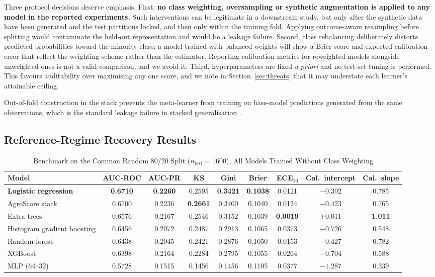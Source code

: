 \documentclass[journal]{IEEEtran}
\begin{document}
Three protocol decisions deserve emphasis. First, \textbf{no class weighting, oversampling or synthetic augmentation is applied to any model in the reported experiments.} Such interventions can be legitimate in a downstream study, but only after the synthetic data have been generated and the test partitions locked, and then only within the training fold. Applying outcome-aware resampling before splitting would contaminate the held-out representation and would be a leakage failure. Second, class rebalancing deliberately distorts predicted probabilities toward the minority class; a model trained with balanced weights will show a Brier score and expected calibration error that reflect the weighting scheme rather than the estimator. Reporting calibration metrics for reweighted models alongside unweighted ones is not a valid comparison, and we avoid it. Third, hyperparameters are fixed \textit{a priori} and no test-set tuning is performed. This favours auditability over maximising any one score, and we note in Section~\ref{sec:threats} that it may understate each learner's attainable ceiling.

Out-of-fold construction in the stack prevents the meta-learner from training on base-model predictions generated from the same observations, which is the standard leakage failure in stacked generalisation \cite{wolpert1992stacking}.

\subsection{Reference-Regime Recovery Results}

\begin{table}[!t]
\caption{Benchmark on the Common Random 80/20 Split ($n_{\text{test}}=1600$), All Models Trained Without Class Weighting}
\label{tab:benchmark}
\centering
\footnotesize
\begin{tabular}{@{}lcccccccc@{}}
\toprule
Model & AUC-ROC & AUC-PR & KS & Gini & Brier & ECE$_{10}$ & Cal.\ intercept & Cal.\ slope \\
\midrule
\textbf{Logistic regression}   & \textbf{0.6710} & \textbf{0.2260} & 0.2595 & \textbf{0.3421} & \textbf{0.1038} & 0.0121 & $-0.392$ & 0.785 \\
AgroScore stack                & 0.6700 & 0.2236 & \textbf{0.2661} & 0.3400 & 0.1040 & 0.0124 & $-0.423$ & 0.765 \\
Extra trees                    & 0.6576 & 0.2167 & 0.2546 & 0.3152 & 0.1039 & \textbf{0.0019} & \textbf{$+0.011$} & \textbf{1.011} \\
Histogram gradient boosting    & 0.6456 & 0.2072 & 0.2487 & 0.2913 & 0.1065 & 0.0373 & $-0.726$ & 0.548 \\
Random forest                  & 0.6438 & 0.2045 & 0.2421 & 0.2876 & 0.1050 & 0.0153 & $-0.427$ & 0.782 \\
XGBoost                        & 0.6398 & 0.2164 & 0.2284 & 0.2795 & 0.1055 & 0.0264 & $-0.704$ & 0.588 \\
MLP (64--32)                   & 0.5728 & 0.1515 & 0.1456 & 0.1456 & 0.1105 & 0.0377 & $-1.287$ & 0.339 \\
\bottomrule
\end{tabular}
\end{table}
\end{document}
